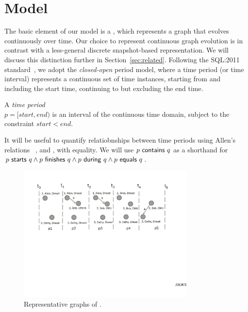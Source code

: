 \section{Model}
\label{sec:model}

The basic element of our model is a \tg, which represents a graph that
evolves continuously over time.  Our choice to represent continuous
graph evolution is in contrast with a less-general discrete
snapshot-based representation.  We will discuss this distinction
further in Section~\ref{sec:related}.  Following the SQL:2011
standard~\cite{DBLP:journals/sigmod/KulkarniM12}, we adopt the {\em
  closed-open} period model, where a time period (or time interval)
represents a continuous set of time instances, starting from and
including the start time, continuing to but excluding the end time.

\begin{definition}
A {\em time period} \\$p = [start, end)$ is an interval of the
  continuous time domain, subject to the constraint $start < end$.
\label{def:period} 
\end{definition}

It will be useful to quantify relatiobnships between time periods
using Allen's relations~\cite{allen83} ,
 and , with equality.  We will
use $p~\mathsf{contains}~q$ as a shorthand for $p~\mathsf{starts}~q
\wedge p~\mathsf{finishes}~q \wedge p~\mathsf{during}~q \wedge
p~\mathsf{equals}~q$.

\begin{figure}
\centering
\includegraphics[width=3.5in]{figs/T1_graphs.pdf}
\caption{Representative graphs of \tg {}.}
\label{fig:tg_rg}
\end{figure}

